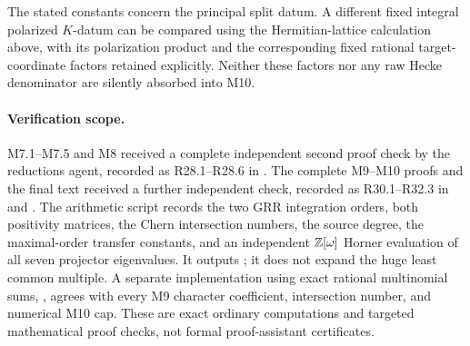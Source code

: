 The stated constants concern the principal split datum. A different
fixed integral polarized $K$-datum can be compared using the
Hermitian-lattice calculation above, with its polarization product
and the corresponding fixed rational target-coordinate factors
retained explicitly. Neither these factors nor any raw Hecke
denominator are silently absorbed into M10.

\paragraph{Verification scope.}
M7.1--M7.5 and M8 received a complete independent second proof check
by the reductions agent, recorded as R28.1--R28.6 in
.
The complete M9--M10 proofs and the final text received a further
independent check, recorded as R30.1--R32.3 in
 and
.
The arithmetic script
 records the two GRR
integration orders, both positivity matrices, the Chern intersection
numbers, the source degree, the maximal-order transfer constants,
and an independent $\mathbb Z[\omega]$ Horner evaluation of all seven
projector eigenvalues. It outputs
; it does not expand the
huge least common multiple. A separate implementation using exact
rational multinomial sums,
, agrees with
every M9 character coefficient, intersection number, and numerical
M10 cap. These are exact ordinary computations
and targeted mathematical proof checks, not formal
proof-assistant certificates.
